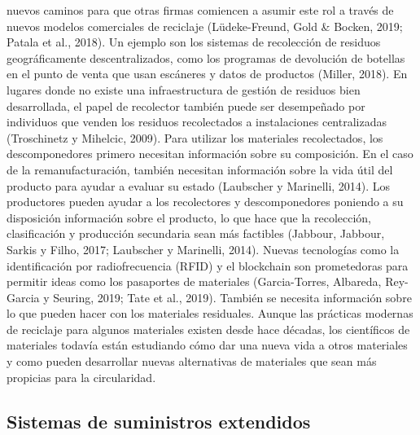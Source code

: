 \documentclass[runningheads]{llncs}
\begin{document}
nuevos caminos para que otras firmas comiencen a asumir este rol a
través de nuevos modelos comerciales de reciclaje (Lüdeke-Freund, Gold
\& Bocken, 2019; Patala et al., 2018). Un ejemplo son los sistemas de
recolección de residuos geográficamente descentralizados, como los
programas de devolución de botellas en el punto de venta que usan
escáneres y datos de productos (Miller, 2018). En lugares donde no
existe una infraestructura de gestión de residuos bien desarrollada, el
papel de recolector también puede ser desempeñado por individuos que
venden los residuos recolectados a instalaciones centralizadas
(Troschinetz y Mihelcic, 2009). Para utilizar los materiales
recolectados, los descomponedores primero necesitan información sobre su
composición. En el caso de la remanufacturación, también necesitan
información sobre la vida útil del producto para ayudar a evaluar su
estado (Laubscher y Marinelli, 2014). Los productores pueden ayudar a
los recolectores y descomponedores poniendo a su disposición información
sobre el producto, lo que hace que la recolección, clasificación y
producción secundaria sean más factibles (Jabbour, Jabbour, Sarkis y
Filho, 2017; Laubscher y Marinelli, 2014). Nuevas tecnologías como la
identificación por radiofrecuencia (RFID) y el blockchain son
prometedoras para permitir ideas como los pasaportes de materiales
(Garcia-Torres, Albareda, Rey-Garcia y Seuring, 2019; Tate et al.,
2019). También se necesita información sobre lo que pueden hacer con los
materiales residuales. Aunque las prácticas modernas de reciclaje para
algunos materiales existen desde hace décadas, los científicos de
materiales todavía están estudiando cómo dar una nueva vida a otros
materiales y como pueden desarrollar nuevas alternativas de materiales
que sean más propicias para la circularidad.

\hypertarget{sistemas-de-suministros-extendidos}{%
\subsection{Sistemas de suministros
extendidos}\label{sistemas-de-suministros-extendidos}}
\end{document}

